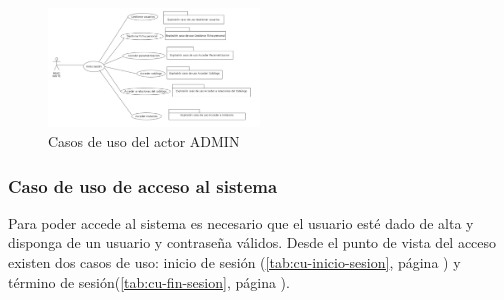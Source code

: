 \begin{figure}[hp!]
  \centering
  \includegraphics[width=0.50\textwidth]{imaxes/cu-admin.png}
  \caption{Casos de uso del actor ADMIN}
  \label{fig:cu-admin}
\end{figure}




\subsubsection{Caso de uso de acceso al sistema} 
\label{sub:cu-acceso}

Para poder accede al sistema es necesario que el usuario esté dado de alta y disponga de un usuario y contraseña válidos. Desde el punto de vista del acceso existen dos casos de uso: inicio de sesión (\ref{tab:cu-inicio-sesion}, página \pageref{tab:cu-inicio-sesion}) y término de sesión(\ref{tab:cu-fin-sesion}, página \pageref{tab:cu-fin-sesion}).



